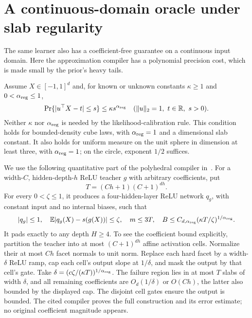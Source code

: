\section{A continuous-domain oracle under slab regularity}
\label{sec:continuous-layerwise}
The same learner also has a coefficient-free guarantee on a continuous input domain. Here the approximation compiler has a polynomial precision cost, which is made small by the prior's heavy tails.

Assume $X\in[-1,1]^d$ and, for known or unknown constants $\kappa\ge1$ and $0<\alpha_{\rm reg}\le1$,
\begin{equation}
 \Pr\{|u^\top X-t|\le s\}\le\kappa s^{\alpha_{\rm reg}}
 \quad(\|u\|_2=1,\ t\in\mathbb R,\ s>0).
 \label{eq:continuous-slab}
\end{equation}
Neither $\kappa$ nor $\alpha_{\rm reg}$ is needed by the likelihood-calibration rule. This condition holds for bounded-density cube laws, with $\alpha_{\rm reg}=1$ and a dimensional slab constant. It also holds for uniform measure on the unit sphere in dimension at least three, with $\alpha_{\rm reg}=1$; on the circle, exponent $1/2$ suffices.

We use the following quantitative part of the polyhedral compiler in~\cite{regular}. For a width-$C$, hidden-depth-$h$ ReLU teacher $g$ with arbitrary coefficients, put
\[
 T=(Ch+1)(C+1)^{dh}.
\]
For every $0<\zeta\le1$, it produces a four-hidden-layer ReLU network $q_g$, with constant input and no internal biases, such that
\begin{equation}
 |q_g|\le1,\quad
 \mathbb E|q_g(X)-s(g(X))|\le\zeta,\quad
 m\le3T,\quad
 B\le C_{d,\alpha_{\rm reg}}(\kappa T/\zeta)^{1/\alpha_{\rm reg}}.
 \label{eq:continuous-slab-compiler}
\end{equation}
It pads exactly to any depth $H\ge4$. To see the coefficient bound explicitly, partition the teacher into at most $(C+1)^{dh}$ affine activation cells. Normalize their at most $Ch$ facet normals to unit norm. Replace each hard facet by a width-$\delta$ ReLU ramp, cap each cell's output slope at $1/\delta$, and mask the output by that cell's gate. Take $\delta=(c\zeta/(\kappa T))^{1/\alpha_{\rm reg}}$. The failure region lies in at most $T$ slabs of width $\delta$, and all remaining coefficients are $O_d(1/\delta)$ or $O(Ch)$, the latter also bounded by the displayed cap. The disjoint cell gates ensure the output is bounded. The cited compiler proves the full construction and its error estimate; no original coefficient magnitude appears.

